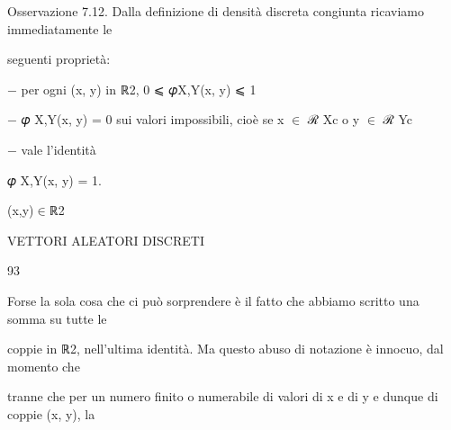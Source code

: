 \documentclass[a4paper,portrait,12pt]{article}
\begin{document}
\begin{flushleft}
Osservazione 7.12. Dalla definizione di densit\`{a} discreta congiunta ricaviamo immediatamente le
\end{flushleft}


\begin{flushleft}
seguenti propriet\`{a}:
\end{flushleft}


\begin{flushleft}
$-$ per ogni (x, y) in ℝ2, 0 ⩽ 𝜑X,Y(x, y) ⩽ 1
\end{flushleft}


\begin{flushleft}
$-$ 𝜑 X,Y(x, y) = 0 sui valori impossibili, cio\`{e} se x $\in$ ℛ Xc o y $\in$ ℛ Yc
\end{flushleft}


\begin{flushleft}
$-$ vale l'identit\`{a}
\end{flushleft}


\begin{flushleft}
𝜑 X,Y(x, y) = 1.
\end{flushleft}


\begin{flushleft}
(x,y)$\in$ℝ2
\end{flushleft}





\begin{flushleft}
 VETTORI ALEATORI DISCRETI
\end{flushleft}





93





\begin{flushleft}
Forse la sola cosa che ci pu\`{o} sorprendere \`{e} il fatto che abbiamo scritto una somma su tutte le
\end{flushleft}


\begin{flushleft}
coppie in ℝ2, nell'ultima identit\`{a}. Ma questo abuso di notazione \`{e} innocuo, dal momento che
\end{flushleft}


\begin{flushleft}
tranne che per un numero finito o numerabile di valori di x e di y e dunque di coppie (x, y), la
\end{flushleft}
\end{document}
